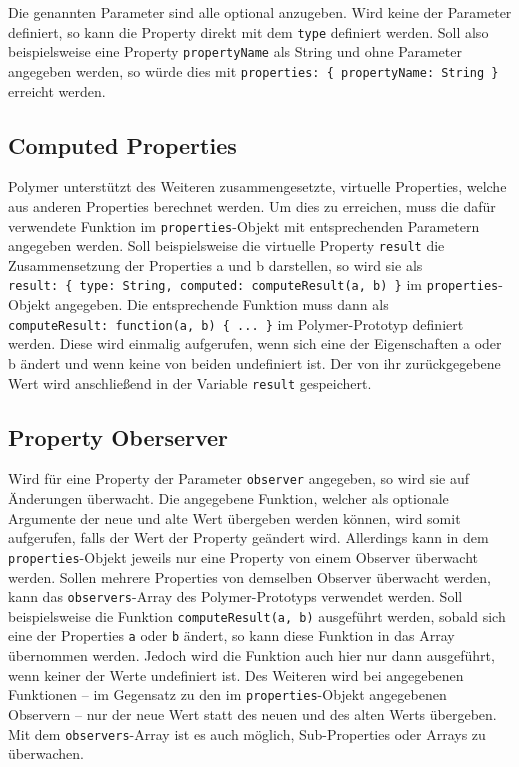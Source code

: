 Die genannten Parameter sind alle optional anzugeben. Wird keine der Parameter definiert, so kann die Property direkt mit dem \texttt{type} definiert werden. Soll also beispielsweise eine Property \texttt{propertyName} als String und ohne Parameter angegeben werden, so würde dies mit \texttt{properties:\ \{\ propertyName:\ String\ \}} erreicht werden.


\subsection{Computed Properties}\label{computed-properties}

Polymer unterstützt des Weiteren zusammengesetzte, virtuelle Properties, welche aus anderen Properties berechnet werden. Um dies zu erreichen, muss die dafür verwendete Funktion im \texttt{properties}-Objekt mit entsprechenden Parametern angegeben werden. Soll beispielsweise die virtuelle Property \texttt{result} die Zusammensetzung der Properties a und b darstellen, so wird sie als \texttt{result:\ \{\ type:\ String,\ computed:\ computeResult(a,\ b)\ \}} im \texttt{properties}-Objekt angegeben. Die entsprechende Funktion muss dann als \texttt{computeResult:\ function(a,\ b)\ \{\ ...\ \}} im Polymer-Prototyp definiert werden. Diese wird einmalig aufgerufen, wenn sich eine der Eigenschaften a oder b ändert und wenn keine von beiden undefiniert ist. Der von ihr zurückgegebene Wert wird anschließend in der Variable \texttt{result} gespeichert.


\subsection{Property Oberserver}\label{property-oberserver}

Wird für eine Property der Parameter \texttt{observer} angegeben, so wird sie auf Änderungen überwacht. Die angegebene Funktion, welcher als optionale Argumente der neue und alte Wert übergeben werden können, wird somit aufgerufen, falls der Wert der Property geändert wird. Allerdings kann in dem \texttt{properties}-Objekt jeweils nur eine Property von einem Observer überwacht werden. Sollen mehrere Properties von demselben Observer überwacht werden, kann das \texttt{observers}-Array des Polymer-Prototyps verwendet werden. Soll beispielsweise die Funktion \texttt{computeResult(a,\ b)} ausgeführt werden, sobald sich eine der Properties \texttt{a} oder \texttt{b} ändert, so kann diese Funktion in das Array übernommen werden. Jedoch wird die Funktion auch hier nur dann ausgeführt, wenn keiner der Werte undefiniert ist. Des Weiteren wird bei angegebenen Funktionen -- im Gegensatz zu den im \texttt{properties}-Objekt angegebenen Observern -- nur der neue Wert statt des neuen und des alten Werts übergeben. Mit dem \texttt{observers}-Array ist es auch möglich, Sub-Properties oder Arrays zu überwachen.

